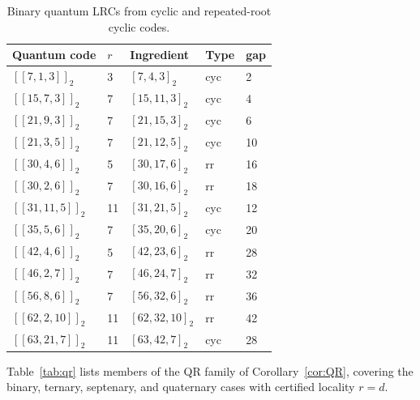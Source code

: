 \documentclass[journal,onecolumn]{IEEEtran}
\begin{document}
\begin{table}[!htbp]
\caption{Binary quantum LRCs from cyclic and repeated-root cyclic codes.}
\label{tab:binary}
\centering
\renewcommand{\arraystretch}{1.15}
\begin{tabular}{lllll}
\toprule
Quantum code & $r$ & Ingredient & Type & gap \\
\midrule
$[[7,1,3]]_2$   & 3  & $[7,4,3]_2$     & cyc & 2 \\
$[[15,7,3]]_2$  & 7  & $[15,11,3]_2$             & cyc & 4 \\
$[[21,9,3]]_2$  & 7  & $[21,15,3]_2$             & cyc & 6 \\
$[[21,3,5]]_2$  & 7  & $[21,12,5]_2$             & cyc & 10 \\
$[[30,4,6]]_2$  & 5  & $[30,17,6]_2$             & rr  & 16 \\
$[[30,2,6]]_2$  & 7  & $[30,16,6]_2$             & rr  & 18 \\
$[[31,11,5]]_2$ & 11 & $[31,21,5]_2$             & cyc & 12 \\
$[[35,5,6]]_2$  & 7  & $[35,20,6]_2$             & cyc & 20 \\
$[[42,4,6]]_2$  & 5  & $[42,23,6]_2$             & rr  & 28 \\
$[[46,2,7]]_2$  & 7  & $[46,24,7]_2$             & rr  & 32 \\
$[[56,8,6]]_2$  & 7  & $[56,32,6]_2$             & rr  & 36 \\
$[[62,2,10]]_2$ & 11 & $[62,32,10]_2$            & rr  & 42 \\
$[[63,21,7]]_2$ & 11 & $[63,42,7]_2$             & cyc & 28 \\
\bottomrule
\end{tabular}
\end{table}

Table~\ref{tab:qr} lists members of the QR family of Corollary~\ref{cor:QR}, covering the binary, ternary, septenary, and quaternary cases with certified locality $r=d$.
\end{document}
